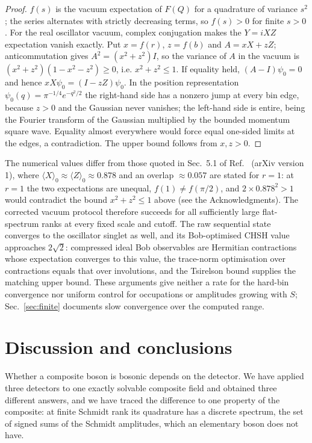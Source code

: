 \documentclass[11pt,a4paper]{article}
\begin{document}
\begin{proof}
$f(s)$ is the vacuum expectation of $F(Q)$ for a quadrature of variance $s^2$; the series alternates with strictly decreasing terms, so $f(s)>0$ for finite $s>0$. For the real oscillator vacuum, complex conjugation makes the $Y=iXZ$ expectation vanish exactly. Put $x=f(r)$, $z=f(b)$ and $A=xX+zZ$; anticommutation gives $A^2=(x^2+z^2)I$, so the variance of $A$ in the vacuum is $(x^2+z^2)(1-x^2-z^2)\ge0$, i.e. $x^2+z^2\le1$. If equality held, $(A-I)\psi_0=0$ and hence $xX\psi_0=(I-zZ)\psi_0$. In the position representation $\psi_0(q)=\pi^{-1/4}e^{-q^2/2}$ the right-hand side has a nonzero jump at every bin edge, because $z>0$ and the Gaussian never vanishes; the left-hand side is entire, being the Fourier transform of the Gaussian multiplied by the bounded momentum square wave. Equality almost everywhere would force equal one-sided limits at the edges, a contradiction. The upper bound follows from $x,z>0$.
\end{proof}

The numerical values differ from those quoted in Sec.~5.1 of Ref.~\cite{Sorella2026} (arXiv version 1), where $\langle X\rangle_0\approx\langle Z\rangle_0\approx0.878$ and an overlap $\approx0.057$ are stated for $r=1$: at $r=1$ the two expectations are unequal, $f(1)\ne f(\pi/2)$, and $2\times0.878^2>1$ would contradict the bound $x^2+z^2\le1$ above (see the Acknowledgments). The corrected vacuum protocol therefore succeeds for all sufficiently large flat-spectrum ranks at every fixed scale and cutoff. The raw sequential state converges to the oscillator singlet as well, and its Bob-optimised CHSH value approaches $2\sqrt2$: compressed ideal Bob observables are Hermitian contractions whose expectation converges to this value, the trace-norm optimisation over contractions equals that over involutions, and the Tsirelson bound \cite{Cirelson1980} supplies the matching upper bound. These arguments give neither a rate for the hard-bin convergence nor uniform control for occupations or amplitudes growing with $S$; Sec.~\ref{sec:finite} documents slow convergence over the computed range.

\section{Discussion and conclusions}
\label{sec:conclusion}
Whether a composite boson is bosonic depends on the detector. We have applied three detectors to one exactly solvable composite field and obtained three different answers, and we have traced the difference to one property of the composite: at finite Schmidt rank its quadrature has a discrete spectrum, the set of signed sums of the Schmidt amplitudes, which an elementary boson does not have.
\end{document}
